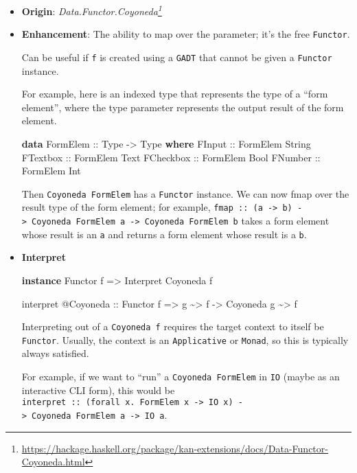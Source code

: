 \documentclass[]{article}
\newenvironment{Shaded}{}{}
\newcommand{\DataTypeTok}[1]{\textcolor[rgb]{0.56,0.13,0.00}{#1}}
\newcommand{\KeywordTok}[1]{\textcolor[rgb]{0.00,0.44,0.13}{\textbf{#1}}}
\newcommand{\NormalTok}[1]{#1}
\newcommand{\OperatorTok}[1]{\textcolor[rgb]{0.40,0.40,0.40}{#1}}
\newcommand{\OtherTok}[1]{\textcolor[rgb]{0.00,0.44,0.13}{#1}}
\renewcommand{\href}[2]{#2\footnote{\url{#1}}}
\begin{document}
\begin{itemize}
\item
  \textbf{Origin}:
  \emph{\href{https://hackage.haskell.org/package/kan-extensions/docs/Data-Functor-Coyoneda.html}{Data.Functor.Coyoneda}}
\item
  \textbf{Enhancement}: The ability to map over the parameter; it's the free
  \texttt{Functor}.

  Can be useful if \texttt{f} is created using a \texttt{GADT} that cannot be
  given a \texttt{Functor} instance.

  For example, here is an indexed type that represents the type of a ``form
  element'', where the type parameter represents the output result of the form
  element.

\begin{Shaded}
\begin{Highlighting}[]
\KeywordTok{data} \DataTypeTok{FormElem}\OtherTok{ ::} \DataTypeTok{Type} \OtherTok{{-}>} \DataTypeTok{Type} \KeywordTok{where}
    \DataTypeTok{FInput}\OtherTok{    ::} \DataTypeTok{FormElem} \DataTypeTok{String}
    \DataTypeTok{FTextbox}\OtherTok{  ::} \DataTypeTok{FormElem} \DataTypeTok{Text}
    \DataTypeTok{FCheckbox}\OtherTok{ ::} \DataTypeTok{FormElem} \DataTypeTok{Bool}
    \DataTypeTok{FNumber}\OtherTok{   ::} \DataTypeTok{FormElem} \DataTypeTok{Int}
\end{Highlighting}
\end{Shaded}

  Then \texttt{Coyoneda\ FormElem} has a \texttt{Functor} instance. We can now
  fmap over the result type of the form element; for example,
  \texttt{fmap\ ::\ (a\ -\textgreater{}\ b)\ -\textgreater{}\ Coyoneda\ FormElem\ a\ -\textgreater{}\ Coyoneda\ FormElem\ b}
  takes a form element whose result is an \texttt{a} and returns a form element
  whose result is a \texttt{b}.
\item
  \textbf{Interpret}

\begin{Shaded}
\begin{Highlighting}[]
\KeywordTok{instance} \DataTypeTok{Functor}\NormalTok{ f }\OtherTok{=>} \DataTypeTok{Interpret} \DataTypeTok{Coyoneda}\NormalTok{ f}

\NormalTok{interpret }\OperatorTok{@}\DataTypeTok{Coyoneda}
\OtherTok{    ::} \DataTypeTok{Functor}\NormalTok{ f}
    \OtherTok{=>}\NormalTok{ g }\OperatorTok{\textasciitilde{}>}\NormalTok{ f}
    \OtherTok{{-}>} \DataTypeTok{Coyoneda}\NormalTok{ g }\OperatorTok{\textasciitilde{}>}\NormalTok{ f}
\end{Highlighting}
\end{Shaded}

  Interpreting out of a \texttt{Coyoneda\ f} requires the target context to
  itself be \texttt{Functor}. Usually, the context is an \texttt{Applicative} or
  \texttt{Monad}, so this is typically always satisfied.

  For example, if we want to ``run'' a \texttt{Coyoneda\ FormElem} in
  \texttt{IO} (maybe as an interactive CLI form), this would be
  \texttt{interpret\ ::\ (forall\ x.\ FormElem\ x\ -\textgreater{}\ IO\ x)\ -\textgreater{}\ Coyoneda\ FormElem\ a\ -\textgreater{}\ IO\ a}.
\end{itemize}
\end{document}
